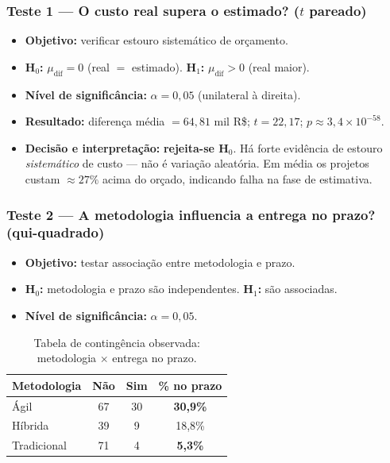 \documentclass[a4paper, 12pt]{article}
\begin{document}
\subsubsection*{Teste 1 --- O custo real supera o estimado? ($t$ pareado)}
\begin{itemize}[noitemsep]
	\item \textbf{Objetivo:} verificar estouro sistemático de orçamento.
	\item \textbf{H$_0$:} $\mu_{\text{dif}} = 0$ (real $=$ estimado).
	      \quad\textbf{H$_1$:} $\mu_{\text{dif}} > 0$ (real maior).
	\item \textbf{Nível de significância:} $\alpha = 0{,}05$ (unilateral à direita).
	\item \textbf{Resultado:} diferença média $= 64{,}81$ mil R\$;
	      $t = 22{,}17$; \textbf{$p \approx 3{,}4\times10^{-58}$}.
	\item \textbf{Decisão e interpretação:} \textbf{rejeita-se H$_0$}. Há forte
	      evidência de estouro \emph{sistemático} de custo --- não é variação
	      aleatória. Em média os projetos custam $\approx 27\%$ acima do orçado,
	      indicando falha na fase de estimativa.
\end{itemize}

\subsubsection*{Teste 2 --- A metodologia influencia a entrega no prazo? (qui-quadrado)}
\begin{itemize}[noitemsep]
	\item \textbf{Objetivo:} testar associação entre metodologia e prazo.
	\item \textbf{H$_0$:} metodologia e prazo são independentes.
	      \quad\textbf{H$_1$:} são associadas.
	\item \textbf{Nível de significância:} $\alpha = 0{,}05$.
\end{itemize}

\begin{table}[H]
\centering
\caption{Tabela de contingência observada: metodologia $\times$ entrega no prazo.}
\label{tab:contingencia}
\begin{tabular}{@{} l c c c @{}}
\toprule
\textbf{Metodologia} & \textbf{Não} & \textbf{Sim} & \textbf{\% no prazo} \\
\midrule
Ágil        & 67 & 30 & \textbf{30,9\%} \\
Híbrida     & 39 & 9  & 18,8\% \\
Tradicional & 71 & 4  & \textbf{5,3\%} \\
\bottomrule
\end{tabular}
\end{table}
\end{document}

